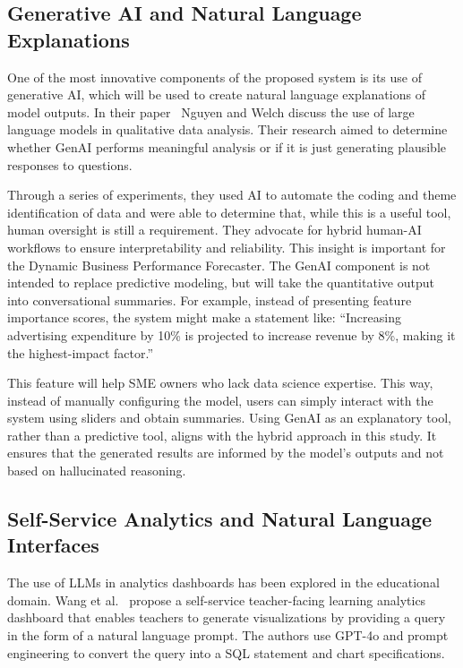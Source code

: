 \documentclass[12pt]{article}
\begin{document}
\subsection{Generative AI and Natural Language Explanations}
One of the most innovative components of the proposed system is its use of generative AI, which will be used to create natural language explanations of model outputs. In their paper~\cite{doi:10.1177/10944281251377154} Nguyen and Welch discuss the use of large language models in qualitative data analysis. Their research aimed to determine whether GenAI performs meaningful analysis or if it is just generating plausible responses to questions.

Through a series of experiments, they used AI to automate the coding and theme identification of data and were able to determine that, while this is a useful tool, human oversight is still a requirement. They advocate for hybrid human-AI workflows to ensure interpretability and reliability. This insight is important for the Dynamic Business Performance Forecaster. The GenAI component is not intended to replace predictive modeling, but will take the quantitative output into conversational summaries. For example, instead of presenting feature importance scores, the system might make a statement like: “Increasing advertising expenditure by 10\% is projected to increase revenue by 8\%, making it the highest-impact factor.”

This feature will help SME owners who lack data science expertise. This way, instead of manually configuring the model, users can simply interact with the system using sliders and obtain summaries. Using GenAI as an explanatory tool, rather than a predictive tool, aligns with the hybrid approach in this study. It ensures that the generated results are informed by the model's outputs and not based on hallucinated reasoning.

\subsection{Self-Service Analytics and Natural Language Interfaces}
The use of LLMs in analytics dashboards has been explored in the educational domain. Wang et al.~\cite{10.1145/3706468.3706491} propose a self-service teacher-facing learning analytics dashboard that enables teachers to generate visualizations by providing a query in the form of a natural language prompt. The authors use GPT-4o and prompt engineering to convert the query into a SQL statement and chart specifications.
\end{document}
